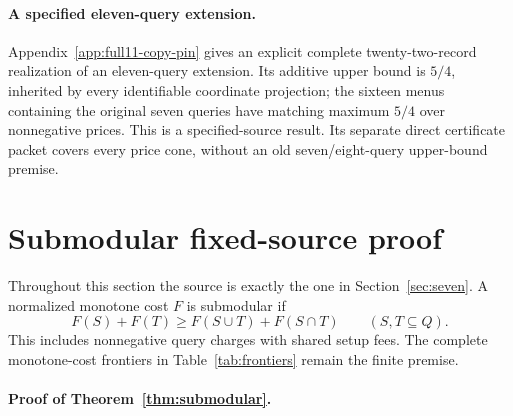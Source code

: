\documentclass[pdflatex,sn-mathphys-num]{sn-jnl}
\theoremstyle{thmstyleone}
\theoremstyle{thmstylethree}
\theoremstyle{thmstyletwo}
\begin{document}
\paragraph*{A specified eleven-query extension.}
Appendix~\ref{app:full11-copy-pin} gives an explicit complete
twenty-two-record realization of an eleven-query extension.
Its additive upper bound is $5/4$, inherited by every identifiable coordinate
projection; the sixteen menus containing the original seven queries have
matching maximum $5/4$ over nonnegative prices. This is a specified-source
result. Its separate direct certificate packet covers every price cone,
without an old seven/eight-query upper-bound premise.

\section{Submodular fixed-source proof}\label{sec:submodular}
Throughout this section the source is exactly the one in Section~\ref{sec:seven}. A normalized monotone cost $F$ is submodular if
\[
 F(S)+F(T)\geq F(S\cup T)+F(S\cap T)\qquad(S,T\subseteq Q).
\]
This includes nonnegative query charges with shared setup fees. The complete monotone-cost frontiers in Table~\ref{tab:frontiers} remain the finite premise.

\paragraph*{Proof of Theorem~\ref{thm:submodular}.}
\end{document}
